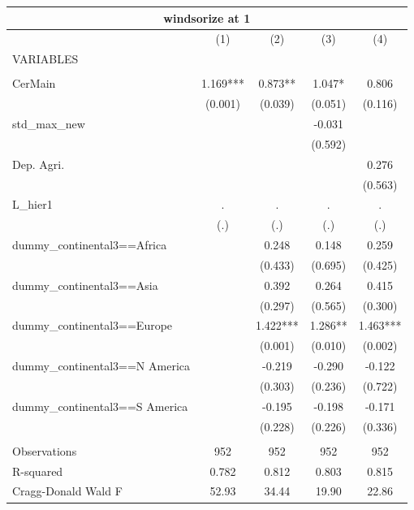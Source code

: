 \begin{tabular}{lcccc}
\multicolumn{5}{c}{windsorize at 1} \\ \hline
 & (1) & (2) & (3) & (4) \\
VARIABLES &  &  &  &  \\ \hline
 &  &  &  &  \\
CerMain & 1.169*** & 0.873** & 1.047* & 0.806 \\
 & (0.001) & (0.039) & (0.051) & (0.116) \\
std\_max\_new &  &  & -0.031 &  \\
 &  &  & (0.592) &  \\
Dep. Agri. &  &  &  & 0.276 \\
 &  &  &  & (0.563) \\
L\_hier1 & . & . & . & . \\
 & (.) & (.) & (.) & (.) \\
dummy\_continental3==Africa &  & 0.248 & 0.148 & 0.259 \\
 &  & (0.433) & (0.695) & (0.425) \\
dummy\_continental3==Asia &  & 0.392 & 0.264 & 0.415 \\
 &  & (0.297) & (0.565) & (0.300) \\
dummy\_continental3==Europe &  & 1.422*** & 1.286** & 1.463*** \\
 &  & (0.001) & (0.010) & (0.002) \\
dummy\_continental3==N America &  & -0.219 & -0.290 & -0.122 \\
 &  & (0.303) & (0.236) & (0.722) \\
dummy\_continental3==S America &  & -0.195 & -0.198 & -0.171 \\
 &  & (0.228) & (0.226) & (0.336) \\
 &  &  &  &  \\
Observations & 952 & 952 & 952 & 952 \\
R-squared & 0.782 & 0.812 & 0.803 & 0.815 \\
 Cragg-Donald Wald F & 52.93 & 34.44 & 19.90 & 22.86 \\ \hline
\end{tabular}
